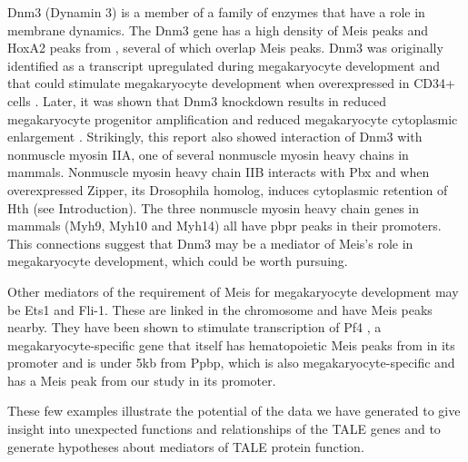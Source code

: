 Dnm3 (Dynamin 3) is a member of a family of enzymes that have a role in membrane dynamics. The Dnm3 gene has a high density of Meis peaks and HoxA2 peaks from \textcite{Donaldson2012}, several of which overlap Meis peaks. Dnm3 was originally identified as a transcript upregulated during megakaryocyte development and that could stimulate megakaryocyte development when overexpressed in CD34+ cells \parencite{Reems2008}. Later, it was shown that Dnm3 knockdown results in reduced megakaryocyte progenitor amplification and reduced megakaryocyte cytoplasmic enlargement \parencite{Wang2011}. Strikingly, this report also showed interaction of Dnm3 with nonmuscle myosin IIA, one of several nonmuscle myosin heavy chains in mammals. Nonmuscle myosin heavy chain IIB interacts with Pbx and when overexpressed Zipper, its Drosophila homolog, induces cytoplasmic retention of Hth (see Introduction). The three nonmuscle myosin heavy chain genes in mammals (Myh9, Myh10 and Myh14) all have \ac{pbpr} peaks in their promoters. This connections suggest that Dnm3 may be a mediator of Meis's role in megakaryocyte development, which could be worth pursuing. 

Other mediators of the requirement of Meis for megakaryocyte development may be Ets1 and Fli-1. These are linked in the chromosome and have Meis peaks nearby. They have been shown to stimulate transcription of Pf4 \parencite{Okada2011}, a megakaryocyte-specific gene that itself has hematopoietic Meis peaks from \textcite{Wilson2010} in its promoter and is under 5kb from Ppbp, which is also megakaryocyte-specific and has a Meis peak from our study in its promoter. 

These few examples illustrate the potential of the data we have generated to give insight into unexpected functions and relationships of the \ac{TALE} genes and to generate hypotheses about mediators of \ac{TALE} protein function.

